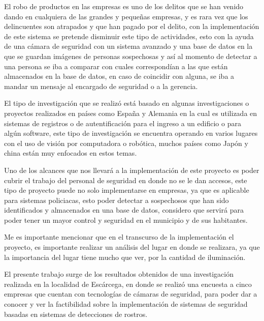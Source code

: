\documentclass{comjnl}
\begin{document}
El robo de productos en las empresas es uno de los delitos que se han venido dando en cualquiera de las grandes y pequeñas empresas, y es rara vez que los delincuentes son atrapados y que han pagado por el delito, con la implementación de este sistema se pretende disminuir este tipo de actividades, esto con la ayuda de una cámara de seguridad con un sistema avanzado y una base de datos en la que se guardan imágenes de personas sospechosas y así al momento de detectar a una persona se iba a comparar con cuales correspondían a las que están almacenados en la base de datos, en caso de coincidir con alguna, se iba a mandar un mensaje al encargado de seguridad o a la gerencia.

El tipo de investigación que se realizó está basado en algunas investigaciones o proyectos realizados en países como España y Alemania en la cual es utilizada en sistemas de registros o de autentificación para el ingreso a un edificio o para algún software, este tipo de investigación se encuentra operando en varios lugares con el uso de visión por computadora o robótica, muchos países como Japón y china están muy enfocados en estos temas.

Uno de los alcances que nos llevará a la implementación de este proyecto es poder cubrir el trabajo del personal de seguridad en donde no se le dan accesos, este tipo de proyecto puede no solo implementarse en empresas, ya que es aplicable para sistemas policiacas, esto poder detectar a sospechosos que han sido identificados y almacenados en una base de datos, considero que servirá para poder tener un mayor control y seguridad en el municipio y de sus habitantes.

Me es importante mencionar que en el transcurso de la implementación el proyecto, es importante realizar un análisis del lugar en donde se realizara, ya que la importancia del lugar tiene mucho que ver, por la cantidad de iluminación.

El presente trabajo surge de los resultados obtenidos de una investigación realizada en la localidad de Escárcega, en donde se realizó una encuesta a cinco empresas que cuentan con tecnologías de cámaras de seguridad, para poder dar a conocer y ver la factibilidad sobre la implementación de sistemas de seguridad basadas en sistemas de detecciones de rostros.
\end{document}
